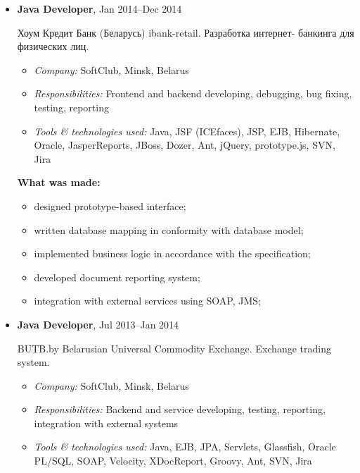 \documentclass[a4paper, 12pt]{article}
\newcommand{\position}[1]{
    \textbf{#1}}
\newcommand{\itemlabel}[1]{
    \textit{#1:}}
\begin{document}
\begin{itemize}
        \item \position{Java Developer}, Jan 2014--Dec 2014

          Хоум Кредит Банк (Беларусь) ibank-retail. Разработка интернет- банкинга для физических лиц. 

            \begin{itemize}
                \item \itemlabel{Company} SoftClub, Minsk, Belarus
                \item \itemlabel{Responsibilities} Frontend and backend developing, debugging, bug fixing, testing, reporting
                \item \itemlabel{Tools \& technologies used} Java, JSF (ICEfaces), JSP, EJB, Hibernate, Oracle, JasperReports, JBoss, Dozer, Ant, jQuery, prototype.js, SVN, Jira
            \end{itemize}
            
               \textbf{What was made:}
			\begin{itemize}
  				\item designed prototype-based interface;
  				\item written database mapping in conformity with database model;
  				\item implemented business logic in accordance with the specification;
				\item developed document reporting system;
  				\item integration with external services using SOAP, JMS;
			\end{itemize}


        \item \position{Java Developer}, Jul 2013--Jan 2014

            BUTB.by Belarusian Universal Commodity Exchange. Exchange trading system.

            \begin{itemize}
                \item \itemlabel{Company} SoftClub, Minsk, Belarus
                \item \itemlabel{Responsibilities} Backend and service developing, testing, reporting, integration with external systems
                \item \itemlabel{Tools \& technologies used} Java, EJB, JPA, Servlets, Glassfish, Oracle PL/SQL, SOAP, Velocity, XDocReport, Groovy, Ant, SVN, Jira
            \end{itemize}
            

\end{itemize}
\end{document}
